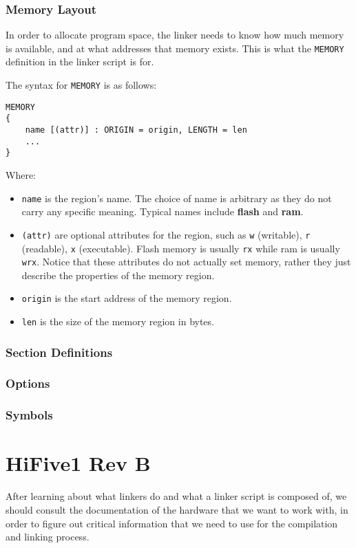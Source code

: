 \documentclass[a4paper,12pt,twoside]{report}
\begin{document}
            \subsection{Memory Layout}
                In order to allocate program space, the linker needs to know how much memory is available, and at what addresses that memory exists. This is what the \verb|MEMORY| definition in the linker script is for.
                
                The syntax for \verb|MEMORY| is as follows:
                \begin{verbatim}
MEMORY
{
    name [(attr)] : ORIGIN = origin, LENGTH = len
    ...
}
                \end{verbatim}
            	Where:
            	\begin{itemize}
            		\item \verb|name| is the region's name. The choice of name is arbitrary as they do not carry any specific meaning. Typical names include \textbf{flash} and \textbf{ram}.
            		\item \verb|(attr)| are optional attributes for the region, such as \verb|w| (writable), \verb|r| (readable), \verb|x| (executable). Flash memory is usually \verb|rx| while ram is usually \verb|wrx|. Notice that these attributes do not actually set memory, rather they just describe the properties of the memory region.
            		\item \verb|origin| is the start address of the memory region.
            		\item \verb|len| is the size of the memory region in bytes.
            	\end{itemize}
            
            \subsection{Section Definitions}
            
            \subsection{Options}
            
            \subsection{Symbols}
            
        \chapter{HiFive1 Rev B}
            After learning about what linkers do and what a linker script is composed of, we should consult the documentation of the hardware that we want to work with, in order to figure out critical information that we need to use for the compilation and linking process.
            
\end{document}
